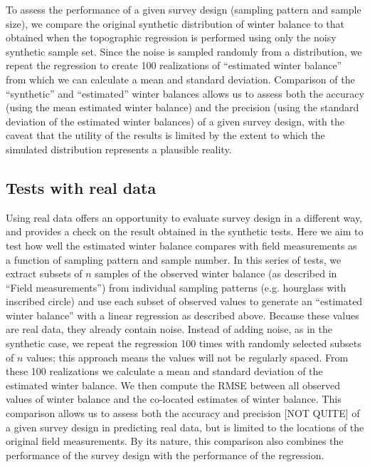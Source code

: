 \documentclass[twocolumn,letterpaper]{igs}
\begin{document}
To assess the performance of a given survey design (sampling pattern and sample size), we compare the original synthetic distribution of winter balance to that obtained when the topographic regression is performed using only the noisy synthetic sample set. 
Since the noise is sampled randomly from a distribution, we repeat the regression to create 100 realizations of ``estimated winter balance'' from which we can calculate a mean and standard deviation. Comparison of the ``synthetic'' and ``estimated'' winter balances allows us to assess both the accuracy (using the mean estimated winter balance) and the precision (using the standard deviation of the estimated winter balances) 
of a given survey design, with the caveat that the utility of the results is limited by the extent to which the simulated distribution represents a plausible reality.   
 
 \subsection{Tests with real data}
 
 Using real data offers an opportunity to evaluate survey design in a different way, and provides a check on the result obtained in the synthetic tests. Here we aim to test how well the estimated winter balance compares with field measurements as a function of sampling pattern and sample number. In this series of tests, we extract subsets of $n$ samples of the observed winter balance (as described in ``Field measurements'') from individual sampling patterns (e.g. hourglass with inscribed circle) and use each subset of observed values to generate an ``estimated winter balance'' with a linear regression as described above. Because these values are real data, they already contain noise. Instead of adding noise, as in the synthetic case, we repeat the regression 100 times with randomly selected subsets of $n$ values; this approach means the values will not be regularly spaced. From these 100 realizations we calculate a mean and standard deviation of the estimated winter balance. We then compute the RMSE between all observed values of winter balance and the co-located estimates of winter balance. This comparison allows us to assess both the accuracy and precision [NOT QUITE] of a given survey design in predicting real data, but is limited to the locations of the original field measurements. By its nature, this comparison also combines the performance of the survey design with the performance of the regression. 
\end{document}
